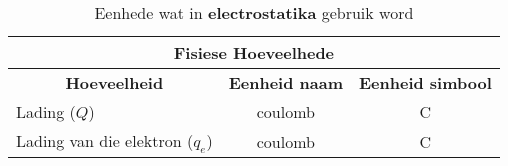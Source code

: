 \begin{table}[H]
\begin{center}
\begin{tabular}{|l|c|c|}\hline \hline 
\multicolumn{3}{|c|}{\textbf{Fisiese Hoeveelhede}}\\ \hline \hline
\multicolumn{1}{|c|}{\textbf{Hoeveelheid}} & \textbf{Eenheid naam} & \textbf{Eenheid simbool}\\ \hline
Lading ($Q$) & coulomb & C \\ \hline
Lading van die elektron ($q_{e}$) & coulomb & C \\ \hline
\end{tabular}
\end{center}
\caption{Eenhede wat in \textbf{electrostatika} gebruik word }
\label{table:electrostatics::units}
\end{table}

